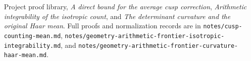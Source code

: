 Project proof library,
\emph{A direct bound for the average cusp correction},
\emph{Arithmetic integrability of the isotropic count}, and
\emph{The determinant curvature and the original Haar mean}.
Full proofs and normalization records are in
\texttt{notes/cusp-counting-mean.md},
\texttt{notes/geometry-arithmetic-frontier-isotropic-integrability.md}, and
\texttt{notes/geometry-arithmetic-frontier-curvature-haar-mean.md}.
